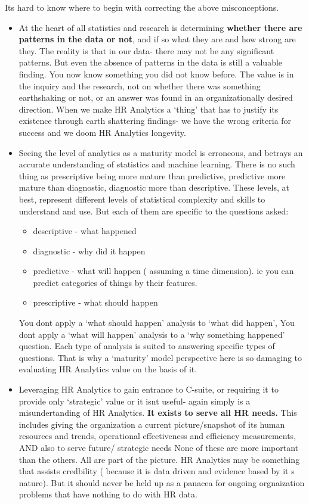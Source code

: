 \documentclass[12pt,letterpaper]{article}
\begin{document}
Its hard to know where to begin with correcting the above
misconceptions.

\begin{itemize}
\item
  At the heart of all statistics and research is determining
  \textbf{whether there are patterns in the data or not}, and if so what
  they are and how strong are they. The reality is that in our data-
  there may not be any significant patterns. But even the absence of
  patterns in the data is still a valuable finding. You now know
  something you did not know before. The value is in the inquiry and the
  research, not on whether there was something earthshaking or not, or
  an answer was found in an organizationally desired direction. When we
  make HR Analytics a `thing' that has to justify its existence through
  earth shattering findings- we have the wrong criteria for success and
  we doom HR Analytics longevity.
\item
  Seeing the level of analytics as a maturity model is erroneous, and
  betrays an accurate understanding of statistics and machine learning.
  There is no such thing as prescriptive being more mature than
  predictive, predictive more mature than diagnostic, diagnostic more
  than descriptive. These levels, at best, represent different levels of
  statistical complexity and skills to understand and use. But each of
  them are specific to the questions asked:

  \begin{itemize}
  \item
    descriptive - what happened
  \item
    diagnostic - why did it happen
  \item
    predictive - what will happen ( assuming a time dimension). ie you
    can predict categories of things by their features.
  \item
    prescriptive - what should happen
  \end{itemize}

  You dont apply a `what should happen' analysis to `what did happen',
  You dont apply a `what will happen' analysis to a `why something
  happened' question. Each type of analysis is suited to answering
  specific types of questions. That is why a `maturity' model
  perspective here is so damaging to evaluating HR Analytics value on
  the basis of it.
\item
  Leveraging HR Analytics to gain entrance to C-suite, or requiring it
  to provide only `strategic' value or it isnt useful- again simply is a
  misundertanding of HR Analytics. \textbf{It exists to serve all HR
  needs.} This includes giving the organization a current
  picture/snapshot of its human resources and trends, operational
  effectiveness and efficiency measurements, AND also to serve future/
  strategic needs None of these are more important than the others. All
  are part of the picture. HR Analytics may be something that assists
  credbility ( because it is data driven and evidence based by it s
  nature). But it should never be held up as a panacea for ongoing
  orgnaization problems that have nothing to do with HR data.
\end{itemize}
\end{document}
